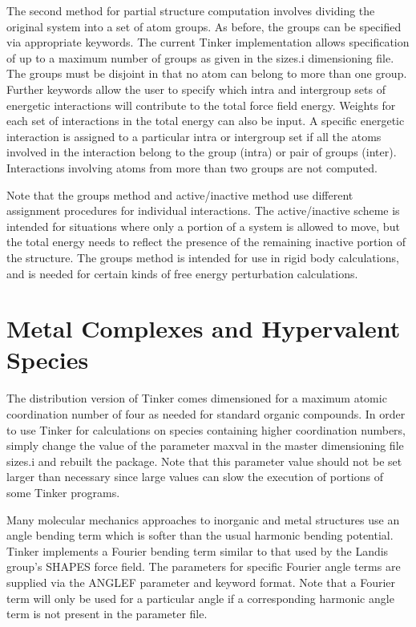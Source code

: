 \documentclass[letterpaper,11pt,english]{sphinxmanual}
\begin{document}
The second method for partial structure computation involves dividing the original system into a set of atom groups. As before, the groups can be specified via appropriate keywords. The current Tinker implementation allows specification of up to a maximum number of groups as given in the sizes.i dimensioning file. The groups must be disjoint in that no atom can belong to more than one group. Further keywords allow the user to specify which intra\sphinxhyphen{} and intergroup sets of energetic interactions will contribute to the total force field energy. Weights for each set of interactions in the total energy can also be input. A specific energetic interaction is assigned to a particular intra\sphinxhyphen{} or intergroup set if all the atoms involved in the interaction belong to the group (intra\sphinxhyphen{}) or pair of groups (inter\sphinxhyphen{}). Interactions involving atoms from more than two groups are not computed.

Note that the groups method and active/inactive method use different assignment procedures for individual interactions. The active/inactive scheme is intended for situations where only a portion of a system is allowed to move, but the total energy needs to reflect the presence of the remaining inactive portion of the structure. The groups method is intended for use in rigid body calculations, and is needed for certain kinds of free energy perturbation calculations.


\section{Metal Complexes and Hypervalent Species}
\label{\detokenize{text/special-features:metal-complexes-and-hypervalent-species}}
The distribution version of Tinker comes dimensioned for a maximum atomic coordination number of four as needed for standard organic compounds. In order to use Tinker for calculations on species containing higher coordination numbers, simply change the value of the parameter maxval in the master dimensioning file sizes.i and rebuilt the package. Note that this parameter value should not be set larger than necessary since large values can slow the execution of portions of some Tinker programs.

Many molecular mechanics approaches to inorganic and metal structures use an angle bending term which is softer than the usual harmonic bending potential. Tinker implements a Fourier bending term similar to that used by the Landis group’s SHAPES force field. The parameters for specific Fourier angle terms are supplied via the ANGLEF parameter and keyword format. Note that a Fourier term will only be used for a particular angle if a corresponding harmonic angle term is not present in the parameter file.
\end{document}
